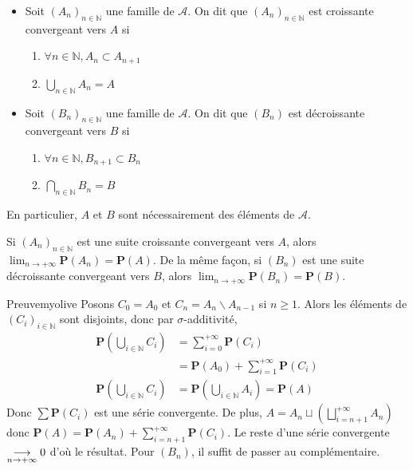     \begin{defi}{}{}
        \begin{itemize}
            \item Soit $(A_n)_{n \in \mathbb{N}}$ une famille de $\mathcal{A}$. On dit que $(A_n)_{n \in \mathbb{N}}$ est croissante convergeant vers $A$ si 
            \begin{enumerate}
                \item $\forall n \in \mathbb{N}, A_n \subset A_{n +1}$
                \item $\bigcup_{n \in \mathbb{N}} A_n = A$
            \end{enumerate}
            \item Soit $(B_n)_{n \in \mathbb{N}}$ une famille de $\mathcal{A}$. On dit que $(B_n)$ est décroissante convergeant vers $B$ si 
            \begin{enumerate}
                \item $\forall n \in \mathbb{N}, B_{n+1} \subset B_n$
                \item $\bigcap_{n \in \mathbb{N}} B_n = B$
            \end{enumerate}
        \end{itemize}
        En particulier, $A$ et $B$ sont nécessairement des éléments de $\mathcal{A}$.
    \end{defi}

    \begin{prop}{}{}
        Si $(A_n)_{n \in \mathbb{N}}$ est une suite croissante convergeant vers $A$, alors $\lim_{n \to +\infty} \mathbf{P}(A_n) = \mathbf{P}(A)$. De la même façon, si $(B_n)$ est une suite décroissante convergeant vers $B$, alors $\lim_{n \to +\infty} \mathbf{P}(B_n) = \mathbf{P}(B)$.
    \end{prop}

    \begin{demo}{Preuve}{myolive}
        Posons $C_0 = A_0$ et $C_n = A_n \backslash A_{n -1}$ si $n \geq 1$. Alors les éléments de $(C_i)_{i \in \mathbb{N}}$ sont disjoints, donc par $\sigma$-additivité, 
        \begin{align*}
            \mathbf{P}\left(\bigcup_{i \in \mathbb{N}} C_i\right) 
            &= \sum_{i = 0}^{+\infty} \mathbf{P}(C_i) \\
            &= \mathbf{P}(A_0) + \sum_{i=1}^{+\infty} \mathbf{P}(C_i) \\
            \mathbf{P}\left(\bigcup_{i \in \mathbb{N}} C_i\right) &= \mathbf{P}\left(\bigcup_{i \in \mathbb{N}} A_i\right) = \mathbf{P}(A)
        \end{align*}
        Donc $\sum \mathbf{P}(C_i)$ est une série convergente. De plus, $A = A_n \sqcup \left(\bigsqcup_{i = n+1}^{+\infty} A_n\right)$ donc $\mathbf{P}(A) = \mathbf{P}(A_n) + \sum_{i =n+1}^{+\infty} \mathbf{P}(C_i)$. Le reste d’une série convergente $\underset{n \rightarrow +\infty}{\longrightarrow} 0$ d’où le résultat. Pour $(B_n)$, il suffit de passer au complémentaire.
    \end{demo}

